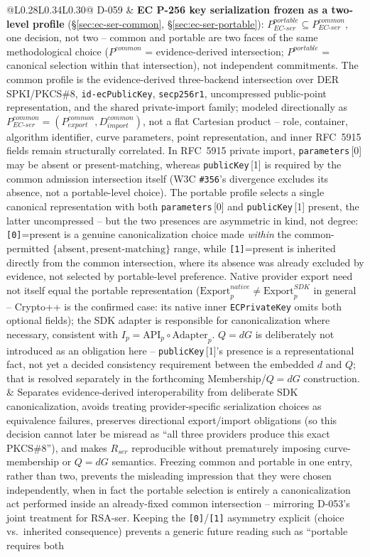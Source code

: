 \documentclass[11pt,a4paper]{article}
\begin{document}
\begin{longtable}{@{}L{0.28\textwidth}L{0.34\textwidth}L{0.30\textwidth}@{}}
D-059 & \textbf{EC P-256 key serialization frozen as a two-level profile} (\S\ref{sec:ec-ser-common}, \S\ref{sec:ec-ser-portable}): $P_{EC\text{-}ser}^{portable} \subseteq P_{EC\text{-}ser}^{common}$, one decision, not two -- common and portable are two faces of the same methodological choice ($P^{common}$ = evidence-derived intersection; $P^{portable}$ = canonical selection within that intersection), not independent commitments. The common profile is the evidence-derived three-backend intersection over DER SPKI/PKCS\#8, \texttt{id-ecPublicKey}, \texttt{secp256r1}, uncompressed public-point representation, and the shared private-import family; modeled directionally as $P_{EC\text{-}ser}^{common}=(P_{export}^{common}, D_{import}^{common})$, not a flat Cartesian product -- role, container, algorithm identifier, curve parameters, point representation, and inner RFC~5915 fields remain structurally correlated. In RFC~5915 private import, \texttt{parameters}\,[0] may be absent or present-matching, whereas \texttt{publicKey}\,[1] is required by the common admission intersection itself (W3C \texttt{\#356}'s divergence excludes its absence, not a portable-level choice). The portable profile selects a single canonical representation with both \texttt{parameters}\,[0] and \texttt{publicKey}\,[1] present, the latter uncompressed -- but the two presences are asymmetric in kind, not degree: \texttt{[0]}=present is a genuine canonicalization choice made \emph{within} the common-permitted $\{\text{absent},\text{present-matching}\}$ range, while \texttt{[1]}=present is inherited directly from the common intersection, where its absence was already excluded by evidence, not selected by portable-level preference. Native provider export need not itself equal the portable representation ($\text{Export}_p^{native} \neq \text{Export}_p^{SDK}$ in general -- Crypto++ is the confirmed case: its native inner \texttt{ECPrivateKey} omits both optional fields); the SDK adapter is responsible for canonicalization where necessary, consistent with $I_p = \text{API}_p \circ \text{Adapter}_p$. $Q=dG$ is deliberately not introduced as an obligation here -- \texttt{publicKey}\,[1]'s presence is a representational fact, not yet a decided consistency requirement between the embedded $d$ and $Q$; that is resolved separately in the forthcoming Membership/$Q=dG$ construction. & Separates evidence-derived interoperability from deliberate SDK canonicalization, avoids treating provider-specific serialization choices as equivalence failures, preserves directional export/import obligations (so this decision cannot later be misread as ``all three providers produce this exact PKCS\#8''), and makes $R_{ser}$ reproducible without prematurely imposing curve-membership or $Q=dG$ semantics. Freezing common and portable in one entry, rather than two, prevents the misleading impression that they were chosen independently, when in fact the portable selection is entirely a canonicalization act performed inside an already-fixed common intersection -- mirroring D-053's joint treatment for RSA-ser. Keeping the \texttt{[0]}/\texttt{[1]} asymmetry explicit (choice vs.\ inherited consequence) prevents a generic future reading such as ``portable requires both 
\end{longtable}
\end{document}
